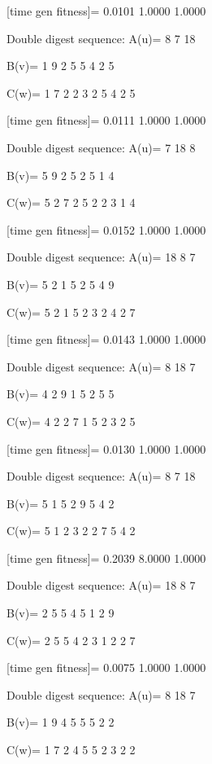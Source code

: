 [time gen fitness]=
    0.0101    1.0000    1.0000

Double digest sequence:
A(u)=
     8     7    18

B(v)=
     1     9     2     5     5     4     2     5

C(w)=
     1     7     2     2     3     2     5     4     2     5

[time gen fitness]=
    0.0111    1.0000    1.0000

Double digest sequence:
A(u)=
     7    18     8

B(v)=
     5     9     2     5     2     5     1     4

C(w)=
     5     2     7     2     5     2     2     3     1     4

[time gen fitness]=
    0.0152    1.0000    1.0000

Double digest sequence:
A(u)=
    18     8     7

B(v)=
     5     2     1     5     2     5     4     9

C(w)=
     5     2     1     5     2     3     2     4     2     7

[time gen fitness]=
    0.0143    1.0000    1.0000

Double digest sequence:
A(u)=
     8    18     7

B(v)=
     4     2     9     1     5     2     5     5

C(w)=
     4     2     2     7     1     5     2     3     2     5

[time gen fitness]=
    0.0130    1.0000    1.0000

Double digest sequence:
A(u)=
     8     7    18

B(v)=
     5     1     5     2     9     5     4     2

C(w)=
     5     1     2     3     2     2     7     5     4     2

[time gen fitness]=
    0.2039    8.0000    1.0000

Double digest sequence:
A(u)=
    18     8     7

B(v)=
     2     5     5     4     5     1     2     9

C(w)=
     2     5     5     4     2     3     1     2     2     7

[time gen fitness]=
    0.0075    1.0000    1.0000

Double digest sequence:
A(u)=
     8    18     7

B(v)=
     1     9     4     5     5     5     2     2

C(w)=
     1     7     2     4     5     5     2     3     2     2

